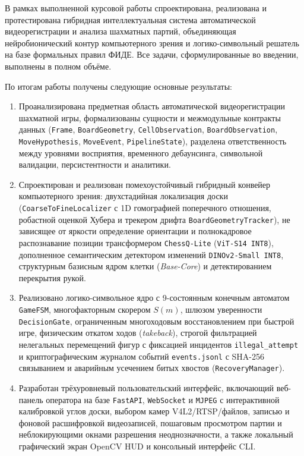 
В рамках выполненной курсовой работы спроектирована, реализована и протестирована гибридная интеллектуальная система автоматической видеорегистрации и анализа шахматных партий, объединяющая нейробионический контур компьютерного зрения и логико-символьный решатель на базе формальных правил ФИДЕ. Все задачи, сформулированные во введении, выполнены в полном объёме.

По итогам работы получены следующие основные результаты:
\begin{enumerate}
    \item Проанализирована предметная область автоматической видеорегистрации шахматной игры, формализованы сущности и межмодульные контракты данных (\texttt{Frame}, \texttt{BoardGeometry}, \texttt{CellObservation}, \texttt{BoardObservation}, \texttt{MoveHypothesis}, \texttt{MoveEvent}, \texttt{PipelineState}), разделена ответственность между уровнями восприятия, временного дебаунсинга, символьной валидации, персистентности и аналитики.
    \item Спроектирован и реализован помехоустойчивый гибридный конвейер компьютерного зрения: двухстадийная локализация доски (\texttt{CoarseToFineLocalizer} с 1D гомографией поперечного отношения, робастной оценкой Хубера и трекером дрифта \texttt{BoardGeometryTracker}), не зависящее от яркости определение ориентации и полнокадровое распознавание позиции трансформером \texttt{ChessQ-Lite} (\texttt{ViT-S14 INT8}), дополненное семантическим детектором изменений \texttt{DINOv2-Small INT8}, структурным базисным ядром клетки (\textit{Base-Core}) и детектированием перекрытия рукой.
    \item Реализовано логико-символьное ядро с 9-состоянным конечным автоматом \texttt{GameFSM}, многофакторным скорером $S(m)$, шлюзом уверенности \texttt{DecisionGate}, ограниченным многоходовым восстановлением при быстрой игре, физическим откатом ходов (\textit{takeback}), строгой фильтрацией нелегальных перемещений фигур с фиксацией инцидентов \texttt{illegal\_attempt} и криптографическим журналом событий \texttt{events.jsonl} с SHA-256 связыванием и аварийным усечением битых хвостов (\texttt{RecoveryManager}).
    \item Разработан трёхуровневый пользовательский интерфейс, включающий веб-панель оператора на базе \texttt{FastAPI}, \texttt{WebSocket} и \texttt{MJPEG} с интерактивной калибровкой углов доски, выбором камер V4L2/RTSP/файлов, записью и фоновой расшифровкой видеозаписей, пошаговым просмотром партии и неблокирующими окнами разрешения неоднозначности, а также локальный графический экран OpenCV HUD и консольный интерфейс CLI.

\end{enumerate}

